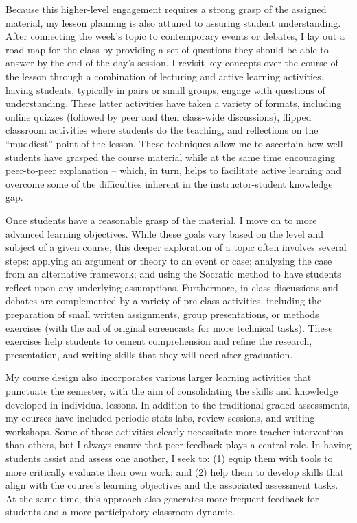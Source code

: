 \documentclass[11pt]{article}
\begin{document}
	Because this higher-level engagement requires a strong grasp of the assigned material, my lesson planning is also attuned to assuring student understanding. After connecting the week's topic to contemporary events or debates, I lay out a road map for the class by providing a set of questions they should be able to answer by the end of the day's session. I revisit key concepts over the course of the lesson through a combination of lecturing and active learning activities, having students, typically in pairs or small groups, engage with questions of understanding. These latter activities have taken a variety of formats, including online quizzes (followed by peer and then class-wide discussions), flipped classroom activities where students do the teaching, and reflections on the ``muddiest'' point of the lesson. These techniques allow me to ascertain how well students have grasped the course material while at the same time encouraging peer-to-peer explanation -- which, in turn, helps to facilitate active learning and overcome some of the difficulties inherent in the instructor-student knowledge gap.

	Once students have a reasonable grasp of the material, I move on to more advanced learning objectives. While these goals vary based on the level and subject of a given course, this deeper exploration of a topic often involves several steps: applying an argument or theory to an event or case; analyzing the case from an alternative framework; and using the Socratic method to have students reflect upon any underlying assumptions. Furthermore, in-class discussions and debates are complemented by a variety of pre-class activities, including the preparation of small written assignments, group presentations, or methods exercises (with the aid of original screencasts for more technical tasks). These exercises help students to cement comprehension and refine the research, presentation, and writing skills that they will need after graduation.

	My course design also incorporates various larger learning activities that punctuate the semester, with the aim of consolidating the skills and knowledge developed in individual lessons. In addition to the traditional graded assessments, my courses have included periodic stats labs, review sessions, and writing workshops. Some of these activities clearly necessitate more teacher intervention than others, but I always ensure that peer feedback plays a central role. In having students assist and assess one another, I seek to: (1) equip them with tools to more critically evaluate their own work; and (2) help them to develop skills that align with the course's learning objectives and the associated assessment tasks. At the same time, this approach also generates more frequent feedback for students and a more participatory classroom dynamic.
\end{document}
